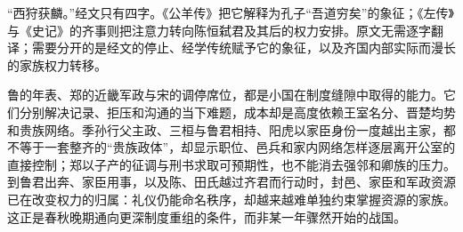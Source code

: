 \begin{textwindow}[《春秋》的最后一笔]
“西狩获麟。”经文只有四字。《公羊传》把它解释为孔子“吾道穷矣”的象征；《左传》与《史记》的齐事则把注意力转向陈恒弑君及其后的权力安排。原文无需逐字翻译；需要分开的是经文的停止、经学传统赋予它的象征，以及齐国内部实际而漫长的家族权力转移。
\end{textwindow}

\begin{turningpoint}
鲁的年表、郑的近畿军政与宋的调停席位，都是小国在制度缝隙中取得的能力。它们分别解决记录、拒压和沟通的当下难题，成本却是高度依赖王室名分、晋楚均势和贵族网络。季孙行父主政、三桓与鲁君相持、阳虎以家臣身份一度越出主家，都不等于一套整齐的“贵族政体”，却显示职位、邑兵和家内网络怎样逐层离开公室的直接控制；郑以子产的征调与刑书求取可预期性，也不能消去强邻和卿族的压力。到鲁君出奔、家臣用事，以及陈、田氏越过齐君而行动时，封邑、家臣和军政资源已在改变权力的归属：礼仪仍能命名秩序，却越来越难单独约束掌握资源的家族。这正是春秋晚期通向更深制度重组的条件，而非某一年骤然开始的战国。
\end{turningpoint}
